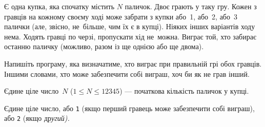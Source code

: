 ﻿Є одна купка, яка спочатку містить $N$ паличок.
Двоє грають у таку гру.
Кожен з гравців на кожному своєму ході може забрати з купки або~1, або~2, або~3 палички (але, звісно, не~більше, чим їх є в купці).
Ніяких інших варіантів ходу нема. 
Ходять гравці по черзі, пропускати хід не~можна.
Виграє той, хто забирає останню паличку (можливо, разом із ще однією або ще двома).

Напишіть програму, яка визначатиме, хто виграє при правильній грі обох гравців. 
Іншими словами, хто може забезпечити собі виграш, хоч би як не грав інший.

\InputFile
Єдине ціле число~$N$ ($1\leqslant N\leqslant 12345$) --- початкова кількість паличок у купці.

\OutputFile
Єдине ціле число, або \texttt{1} (якщо перший гравець може забезпечити собі виграш), або \texttt{2} (якщо др\it{у}гий).

\Examples

\begin{example}
\end{example}

